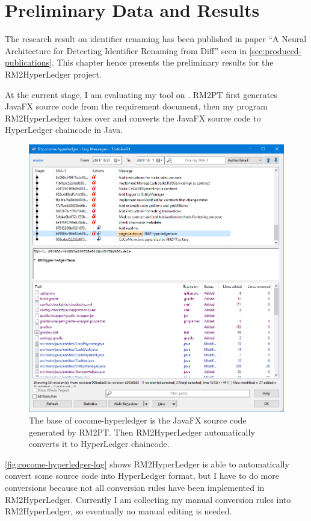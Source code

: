 \chapter{Preliminary Data and Results}

The research result on identifier renaming has been published in paper ``A Neural Architecture for Detecting Identifier Renaming from Diff'' seen in \autoref{sec:produced-publications}.
This chapter hence presents the preliminary results for the RM2HyperLedger project.

At the current stage, I am evaluating my tool on \cocome. RM2PT first generates JavaFX source code from the requirement document, then my program RM2HyperLedger takes over and converts the JavaFX source code to HyperLedger chaincode in Java.

\begin{figure}[ht]
\centering
\includegraphics[width=0.9\linewidth]{cocome-hyperledger-log}
\caption{The base of cocome-hyperledger is the JavaFX source code generated by RM2PT. Then RM2HyperLedger automatically converts it to HyperLedger chaincode.}
\label{fig:cocome-hyperledger-log}
\end{figure}

\autoref{fig:cocome-hyperledger-log} shows RM2HyperLedger is able to automatically convert some source code into HyperLedger format, but I have to do more conversions because not all conversion rules have been implemented in RM2HyperLedger. Currently I am collecting my manual conversion rules into RM2HyperLedger, so eventually no manual editing is needed.

